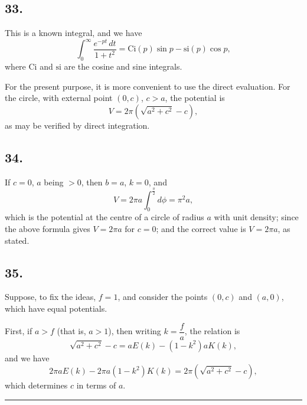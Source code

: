 \documentclass[11pt,a4paper]{article}
\begin{document}
\subsection*{33.}

This is a known integral, and we have
\[
\int_0^{\infty} \frac{e^{-pt}\,dt}{1+t^2}
  = \mathrm{Ci}(p)\sin p - \mathrm{si}(p)\cos p,
\]
where $\mathrm{Ci}$ and $\mathrm{si}$ are the cosine and sine integrals.

For the present purpose, it is more convenient to use the direct evaluation.
For the circle, with external point $(0,c)$, $c>a$, the potential is
\[
V = 2\pi\left(\sqrt{a^2+c^2}-c\right),
\]
as may be verified by direct integration.

\newpage
\subsection*{34.}

If $c=0$, $a$ being $>0$, then $b=a$, $k=0$, and
\[
V = 2\pi a \int_0^{\frac{\pi}{2}} d\phi = \pi^2 a,
\]
which is the potential at the centre of a circle of radius $a$ with unit
density; since the above formula gives $V=2\pi a$ for $c=0$; and the correct
value is $V=2\pi a$, as stated.

\subsection*{35.}

Suppose, to fix the ideas, $f=1$, and consider the points $(0,c)$ and
$(a,0)$, which have equal potentials.

First, if $a>f$ (that is, $a>1$), then writing $k=\dfrac{f}{a}$, the
relation is
\[
\sqrt{a^2+c^2}-c = aE(k) - (1-k^2)aK(k),
\]
and we have
\[
2\pi a E(k) - 2\pi a(1-k^2)K(k) = 2\pi(\sqrt{a^2+c^2}-c),
\]
which determines $c$ in terms of $a$.

\vspace{2em}
\begin{center}
\rule{0.8\textwidth}{0.4pt}
\end{center}
\end{document}

